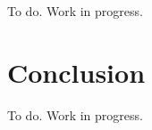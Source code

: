 \documentclass[
  oneside,
  english,
  coorientadorbanca,
  noabntexcite
]{ufsc-thesis-rn46-2019}
\begin{document}
To do. Work in progress.

\section{Conclusion}

To do. Work in progress.


\postextual{}

\printbibliography{}
\end{document}
